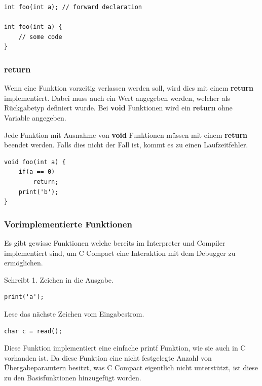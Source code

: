 \begin{lstlisting}[language=CMM]
int foo(int a); // forward declaration

int foo(int a) {
	// some code
}
\end{lstlisting}

\subsubsection{return}

Wenn eine Funktion vorzeitig verlassen werden soll, wird dies mit einem \textbf{return} implementiert. Dabei muss auch ein Wert angegeben werden, welcher als R\"uckgabetyp definiert wurde. Bei \textbf{void} Funktionen wird ein \textbf{return} ohne Variable angegeben.

Jede Funktion mit Ausnahme von \textbf{void} Funktionen m\"ussen mit einem \textbf{return} beendet werden. Falls dies nicht der Fall ist, kommt es zu einen Laufzeitfehler.

\begin{lstlisting}[language=CMM]
void foo(int a) {
	if(a == 0)
		return;
	print('b');
}
\end{lstlisting}

\subsubsection{Vorimplementierte Funktionen}

Es gibt gewisse Funktionen welche bereits im Interpreter und Compiler implementiert sind, um C Compact eine Interaktion mit dem Debugger zu erm\"oglichen.


Schreibt 1. Zeichen in die Ausgabe. 

\begin{lstlisting}[language=CMM]
print('a');
\end{lstlisting}


Lese das n\"achste Zeichen vom Eingabestrom.

\begin{lstlisting}[language=CMM]
char c = read();
\end{lstlisting}


Diese Funktion implementiert eine einfache printf Funktion, wie sie auch in C vorhanden  ist. Da diese Funktion eine nicht festgelegte Anzahl von \"Ubergabeparamtern besitzt, was C Compact eigentlich nicht unterst\"utzt, ist diese zu den Basisfunktionen hinzugef\"ugt worden.

